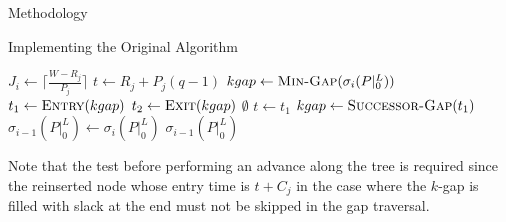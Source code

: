 \documentclass{article}
\begin{document}
\begin{section}{Methodology}
\begin{subsection}{Implementing the Original Algorithm}
\begin{paragraph}{}
    \begin{algorithm}[H]
      \caption{Gap-Tranformation Algorithm\autocite[12]{BelwalCheng}}\label{gapxfrm1}
      \begin{algorithmic}[2]
          \State $J_{i} \gets \lceil\frac{W - R_{j}}{P_{j}}\rceil$
            \State $t \gets R_{j} + P_{j}(q-1)$
            \State $kgap \gets \Call{Min-Gap}{\sigma_{i}(P|_{0}^{L})}$
            \State $t_{1} \gets \Call{Entry}{kgap}$
            \State $t_{2} \gets \Call{Exit}{kgap}$
                \State \Return $\emptyset$
              \EndIf
                \State $t \gets t_{1}$
              \EndIf
                \State \Call{Gap-Delete}{$\sigma_{i}(P|_{0}^{L}), [t_{1},t_{2})$}
                  \State \Call{Gap-Insert}{$\sigma_{i}(P|_{0}^{L}), [t_{1},t)$}
                  \ExitWhile
                \EndIf
                  \State \Call{Gap-Insert}{$\sigma_{i}(P|_{0}^{L}), [t_{1},t)$}
                  \State \Call{Gap-Insert}{$\sigma_{i}(P|_{0}^{L}), [t + C_{j},t_{2})$}
                  \ExitWhile
                \EndIf
                  \State \Call{Gap-Insert}{$\sigma_{i}(P|_{0}^{L}), [t_{1},t)$}
                \EndIf
              \EndIf
                \State $kgap \gets \Call{Successor-Gap}{t_{1}}$
              \EndIf
            \EndWhile
          \EndFor
          \State $\sigma_{i-1}(P|_{0}^{L}) \gets \sigma_{i}(P|_{0}^{L})$
          \State \Return $\sigma_{i-1}(P|_{0}^{L})$
        \EndFunction
      \end{algorithmic}
    \end{algorithm}
    \end{paragraph}
    \begin{paragraph}{}
      Note that the test before performing an advance along the tree is required
      since the reinserted node whose entry time is $t + C_{j}$ in the case where
      the $k$-gap is filled with slack at the end must not be skipped in the gap traversal.
    \end{paragraph}
  \end{subsection}


\end{section}
\end{document}
